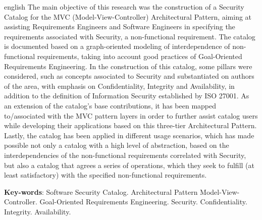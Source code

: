 \begin{resumo}[Abstract]
 \begin{otherlanguage*}{english}
   The main objective of this research was the construction of a Security Catalog for the MVC (Model-View-Controller) Architectural Pattern, 
   aiming at assisting Requirements Engineers and Software Engineers in specifying the requirements associated with Security, a non-functional requirement. The catalog is documented based on a graph-oriented modeling of interdependence of non-functional requirements, taking into account good practices of Goal-Oriented Requirements Engineering. In the construction of this catalog, some pillars were considered, such as concepts associated to Security and substantiated on authors of the area, with emphasis on Confidentiality, Integrity and Availability, in addition to the definition of Information Security established by ISO 27001. As an extension of the catalog's base contributions, it has been mapped to/associated with the MVC pattern layers in order to further assist catalog users while developing their applications based on this three-tier Architectural Pattern. Lastly, the catalog has been applied in different usage scenarios, which has made possible not only a catalog with a high level of abstraction, based on the interdependencies of the non-functional requirements correlated with Security, but also a catalog that agrees a series of operations, which they seek to fulfill (at least satisfactory) with the specified non-functional requirements.

   \vspace{\onelineskip}
 
   \noindent 
   \textbf{Key-words}: Software Security Catalog. Architectural Pattern Model-View-Controller. Goal-Oriented Requirements Engineering. Security. Confidentiality. Integrity. Availability. 
 \end{otherlanguage*}
\end{resumo}
